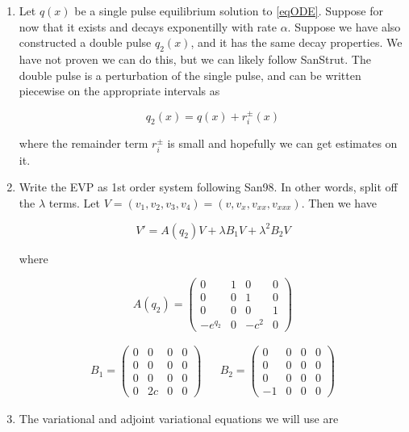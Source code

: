 \documentclass[12pt]{article}
\begin{document}
\begin{enumerate}

\item Let $q(x)$ be a single pulse equilibrium solution to \eqref{eqODE}. Suppose for now that it exists and decays exponentilly with rate $\alpha$. Suppose we have also constructed a double pulse $q_2(x)$, and it has the same decay properties. We have not proven we can do this, but we can likely follow SanStrut. The double pulse is a perturbation of the single pulse, and can be written piecewise on the appropriate intervals as

\[
q_2(x) = q(x) + r_i^\pm(x)
\]

where the remainder term $r_i^\pm$ is small and hopefully we can get estimates on it.

\item Write the EVP as 1st order system following San98. In other words, split off the $\lambda$ terms. Let $V = (v_1, v_2, v_3, v_4) = (v, v_x, v_{xx}, v_{xxx})$. Then we have

\begin{equation}\label{splitevp}
V' = A(q_2)V + \lambda B_1 V + \lambda^2 B_2 V
\end{equation}

where

\begin{equation}
A(q_2) = \begin{pmatrix}
0 & 1 & 0 & 0 \\
0 & 0 & 1 & 0 \\
0 & 0 & 0 & 1 \\
-e^{q_2} & 0 & -c^2 & 0 
\end{pmatrix}
\end{equation}

\begin{align*}
B_1 = \begin{pmatrix}
0 & 0 & 0 & 0 \\
0 & 0 & 0 & 0 \\
0 & 0 & 0 & 0 \\
0 & 2 c & 0 & 0 
\end{pmatrix} &&
B_2 = \begin{pmatrix}
0 & 0 & 0 & 0 \\
0 & 0 & 0 & 0 \\
0 & 0 & 0 & 0 \\
-1 & 0 & 0 & 0 
\end{pmatrix}
\end{align*}

\item The variational and adjoint variational equations we will use are


\end{enumerate}
\end{document}

